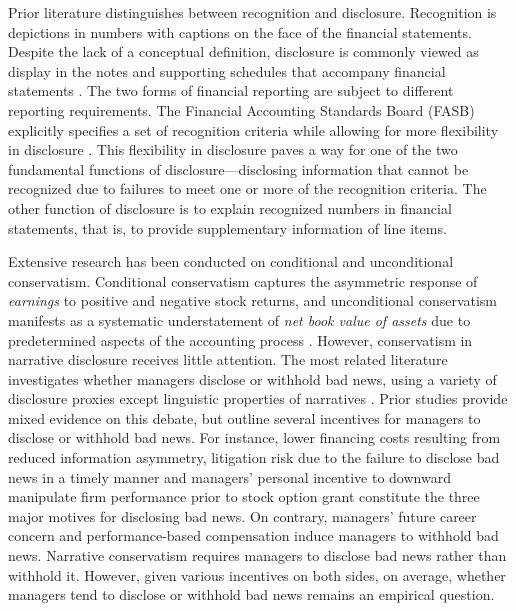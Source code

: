 \documentclass[a4paper]{article}
\begin{document}
\begin{spacing}{2}
Prior literature distinguishes between recognition and disclosure. Recognition is depictions in numbers with captions on the face of the financial statements. Despite the lack of a conceptual definition, disclosure is commonly viewed as display in the notes and supporting schedules that accompany financial statements \citep*{schipperRequiredDisclosuresFinancial2007}. The two forms of financial reporting are subject to different reporting requirements. The Financial Accounting Standards Board (FASB) explicitly specifies a set of recognition criteria while allowing for more flexibility in disclosure \citep*{fasbStatementFinancialAccounting1984}. This flexibility in disclosure paves a way for one of the two fundamental functions of disclosure---disclosing information that cannot be recognized due to failures to meet one or more of the recognition criteria. The other function of disclosure is to explain recognized numbers in financial statements, that is, to provide supplementary information of line items. 

Extensive research has been conducted on conditional and unconditional conservatism. Conditional conservatism captures the asymmetric response of \textit{earnings} to positive and negative stock returns, and unconditional conservatism manifests as a systematic understatement of \textit{net book value of assets} due to predetermined aspects of the accounting process \citep[e.g.,][]{beaverConditionalUnconditionalConservatism2005}. However, conservatism in narrative disclosure receives little attention. The most related literature investigates whether managers disclose or withhold bad news, using a variety of disclosure proxies except linguistic properties of narratives \citep*{baoManagersDiscloseWithhold2019, kothariManagersWithholdBad2009, skinnerWhyFirmsVoluntarily1994, skinnerEarningsDisclosuresStockholder1997}. Prior studies provide mixed evidence on this debate, but outline several incentives for managers to disclose or withhold bad news. For instance, lower financing costs resulting from reduced information asymmetry, litigation risk due to the failure to disclose bad news in a timely manner and managers' personal incentive to downward manipulate firm performance prior to stock option grant constitute the three major motives for disclosing bad news. On contrary, managers' future career concern and performance-based compensation induce managers to withhold bad news. Narrative conservatism requires managers to disclose bad news rather than withhold it. However, given various incentives on both sides, on average, whether managers tend to disclose or withhold bad news remains an empirical question.


\end{spacing}
\end{document}
